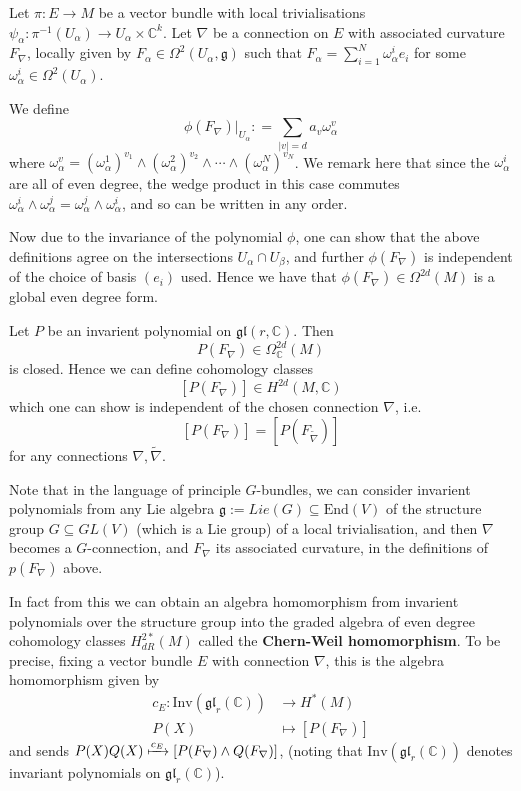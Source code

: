 \documentclass[a4paper]{article}
\theoremstyle{definition} \newtheorem*{definition}{Definition}
\theoremstyle{definition} \newtheorem*{definitions}{Definitions}
\theoremstyle{plain} \newtheorem{theorem}{Theorem}[section]
\theoremstyle{plain} \newtheorem{proposition}[theorem]{Proposition}
\theoremstyle{plain} \newtheorem{corollary}[theorem]{Corollary}
\theoremstyle{plain} \newtheorem{lemma}[theorem]{Lemma}
\theoremstyle{plain} \newtheorem{example}[theorem]{Example}
\newcommand{\defn}[1]{\textbf{#1}}
\newcommand{\complexnos}{\mathbb{C}}
\newcommand{\End}{\text{End}}
\begin{document}
Let $\pi:E\to M$ be a vector bundle with local trivialisations 
$\psi_\alpha:\pi^{-1}(U_\alpha)\to U_\alpha \times \complexnos^k$. Let $\nabla$ be a connection on $E$ with associated curvature $F_\nabla$, locally given by $F_\alpha \in \Omega^2(U_\alpha, \mathfrak{g})$ such that 
$F_\alpha = \sum_{i=1}^N \omega^i_\alpha e_i$
for some $\omega^i_\alpha\in \Omega^2(U_\alpha)$. 

We define
$$\phi(F_\nabla)|_{U_\alpha} : = \sum_{|v|=d} a_v\omega^v_\alpha$$
where $\omega^v_\alpha = (\omega^1_\alpha)^{v_1} \wedge (\omega^2_\alpha)^{v_2} \wedge \cdots \wedge (\omega^N_\alpha)^{v_N} $. 
We remark here that since the $\omega^i_\alpha$ are all of even degree, the wedge product in this case commutes $\omega^i_\alpha \wedge \omega^j_\alpha = \omega^j_\alpha \wedge \omega^i_\alpha$, and so can be written in any order.

Now due to the invariance of the polynomial $\phi$, one can show that the above definitions agree on the intersections $U_\alpha\cap U_\beta$, and further $\phi(F_\nabla)$ is independent of the choice of basis $(e_i)$ used. Hence we have that $\phi(F_\nabla)\in \Omega^{2d}(M)$ is a global even degree form. 

Let $P$ be an invarient polynomial on $\mathfrak{gl}(r, \complexnos)$. Then
$$P(F_\nabla)\in \Omega^{2d}_\complexnos(M)$$
is closed. Hence we can define cohomology classes
$$[P(F_\nabla)]\in H^{2d}(M, \complexnos)$$
which one can show is independent of the chosen connection $\nabla$, i.e.
$$[P(F_\nabla)]=[P(F_{\tilde{\nabla}} )]$$
for any connections $\nabla, \tilde{\nabla}$. 

Note that in the language of principle $G$-bundles, we can consider invarient polynomials from any Lie algebra $\mathfrak{g}:=Lie(G)\subseteq \End(V)$ of the structure group $G\subseteq GL(V)$ (which is a Lie group) of a local trivialisation, and then $\nabla$ becomes a $G$-connection, and $F_\nabla$ its associated curvature, in the definitions of $p(F_\nabla)$ above. 

In fact from this we can obtain an algebra homomorphism from invarient polynomials over the structure group into the graded algebra of even degree cohomology classes $H^{2*}_{dR}(M)$ called the \defn{Chern-Weil homomorphism}. To be precise, fixing a vector bundle $E$ with connection $\nabla$, this is the algebra homomorphism given by
\begin{align*}
    c_E : \text{Inv}(\mathfrak{gl}_r(\complexnos)) & \to H^* (M) \\
     P(X) & \mapsto [P(F_\nabla)]
\end{align*}
and sends $P(X)Q(X)\xmapsto{c_E} [P(F_\nabla)\wedge Q(F_\nabla)]$, (noting that $\text{Inv}(\mathfrak{gl}_r(\complexnos))$ denotes invariant polynomials on $\mathfrak{gl}_r(\complexnos)$).
\end{document}
